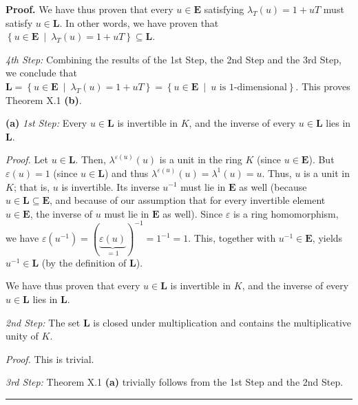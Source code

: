 \documentclass[numbers=enddot,12pt,final,onecolumn,notitlepage]{scrartcl}%
\newenvironment{proof}[1][Proof]{\noindent\textbf{#1.} }{\ \rule{0.5em}{0.5em}}
\begin{document}
\begin{proof}
We have thus proven that every $u\in\mathbf{E}$ satisfying $\lambda_{T}\left(
u\right)  =1+uT$ must satisfy $u\in\mathbf{L}$. In other words, we have proven
that $\left\{  u\in\mathbf{E}\ \mid\ \lambda_{T}\left(  u\right)
=1+uT\right\}  \subseteq\mathbf{L}$.

\textit{4th Step:} Combining the results of the 1st Step, the 2nd Step and the
3rd Step, we conclude that $\mathbf{L}=\left\{  u\in\mathbf{E}\ \mid
\ \lambda_{T}\left(  u\right)  =1+uT\right\}  =\left\{  u\in\mathbf{E}%
\ \mid\ u\text{ is }1\text{-dimensional}\right\}  $. This proves Theorem X.1
\textbf{(b)}.

\textbf{(a)} \textit{1st Step:} Every $u\in\mathbf{L}$ is invertible in $K$,
and the inverse of every $u\in\mathbf{L}$ lies in $\mathbf{L}$.

\textit{Proof.} Let $u\in\mathbf{L}$. Then, $\lambda^{\varepsilon\left(
u\right)  }\left(  u\right)  $ is a unit in the ring $K$ (since $u\in
\mathbf{E}$). But $\varepsilon\left(  u\right)  =1$ (since $u\in\mathbf{L}$)
and thus $\lambda^{\varepsilon\left(  u\right)  }\left(  u\right)
=\lambda^{1}\left(  u\right)  =u$. Thus, $u$ is a unit in $K$; that is, $u$ is
invertible. Its inverse $u^{-1}$ must lie in $\mathbf{E}$ as well (because
$u\in\mathbf{L}\subseteq\mathbf{E}$, and because of our assumption that for
every invertible element $u\in\mathbf{E}$, the inverse of $u$ must lie in
$\mathbf{E}$ as well). Since $\varepsilon$ is a ring homomorphism, we have
$\varepsilon\left(  u^{-1}\right)  =\left(  \underbrace{\varepsilon\left(
u\right)  }_{=1}\right)  ^{-1}=1^{-1}=1$. This, together with $u^{-1}%
\in\mathbf{E}$, yields $u^{-1}\in\mathbf{L}$ (by the definition of
$\mathbf{L}$).

We have thus proven that every $u\in\mathbf{L}$ is invertible in $K$, and the
inverse of every $u\in\mathbf{L}$ lies in $\mathbf{L}$.

\textit{2nd Step:} The set $\mathbf{L}$ is closed under multiplication and
contains the multiplicative unity of $K$.

\textit{Proof.} This is trivial.

\textit{3rd Step:} Theorem X.1 \textbf{(a)} trivially follows from the 1st
Step and the 2nd Step.
\end{proof}
\end{document}
